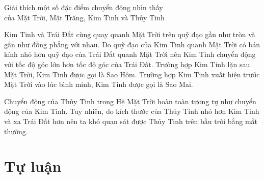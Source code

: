 \begin{dang}{Giải thích một số đặc điểm chuyển động nhìn thấy\\ của Mặt Trời, Mặt Trăng, Kim Tinh và Thủy Tinh}
{		Kim Tinh và Trái Đất cùng quay quanh Mặt Trời trên quỹ đạo gần như tròn và gần như đồng phẳng với nhau. Do quỹ đạo của Kim Tinh quanh Mặt Trời có bán kính nhỏ hơn quỹ đạo của Trái Đất quanh Mặt Trời nên Kim Tinh chuyển động với tốc độ góc lớn hơn tốc độ góc của Trái Đất. Trường hợp Kim Tinh lặn sau Mặt Trời, Kim Tinh được gọi là Sao Hôm. Trường hợp Kim Tinh xuất hiện trước Mặt Trời vào lúc bình minh, Kim Tinh được gọi là Sao Mai.
		
		Chuyển động của Thủy Tinh trong Hệ Mặt Trời hoàn toàn tương tự như chuyển động của Kim Tinh. Tuy nhiên, do kích thước của Thủy Tinh nhỏ hơn Kim Tinh và xa Trái Đất hơn nên ta khó quan sát được Thủy Tinh trên bầu trời bằng mắt thường.
		
	}
\end{dang}
\section{Tự luận}
